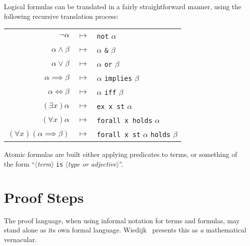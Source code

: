 \begin{node}[Formulas]\label{mizar-0003}%
Logical formulas can be translated in a fairly straightforward manner,
using the following recursive translation process:
\begin{center}
\begin{tabular}{rcl}
$\neg\alpha$ & $\mapsto$ & \texttt{not} $\alpha$\\
$\alpha\land\beta$ & $\mapsto$ & $\alpha$ \texttt{\&} $\beta$\\
$\alpha\lor\beta$ & $\mapsto$ & $\alpha$ \texttt{or} $\beta$\\
$\alpha\implies\beta$ & $\mapsto$ & $\alpha$ \texttt{implies} $\beta$\\
$\alpha\iff\beta$ & $\mapsto$ & $\alpha$ \texttt{iff} $\beta$\\
$(\exists x)\alpha$ & $\mapsto$ & \texttt{ex x st} $\alpha$\\
$(\forall x)\alpha$ & $\mapsto$ & \texttt{forall x holds} $\alpha$\\
$(\forall x)(\alpha\implies\beta)$ & $\mapsto$ & \texttt{forall x st} $\alpha$ \texttt{holds} $\beta$\\
\end{tabular}
\end{center}
Atomic formulas are built either applying predicates to terms, or
something of the form ``$\langle$\textit{term}$\rangle$ \texttt{is}
$\langle$\textit{type or adjective}$\rangle$''.
\end{node}

\section{Proof Steps}

\begin{node}\label{mizar-0002}%
The proof language, when using informal notation for terms and formulas,
may stand alone as its own formal language. Wiedijk~\cite{wiedijk2000vernacular}
presents this as \emph{a} mathematical vernacular.
\end{node}

